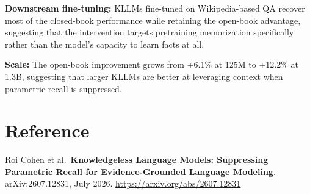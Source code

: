\documentclass[10pt,twocolumn]{article}
\begin{document}
\textbf{Downstream fine-tuning:} KLLMs fine-tuned on Wikipedia-based
QA recover most of the closed-book performance while retaining
the open-book advantage, suggesting that the intervention targets
pretraining memorization specifically rather than the model's capacity
to learn facts at all.

\textbf{Scale:} The open-book improvement grows from +6.1\% at 125M
to +12.2\% at 1.3B, suggesting that larger KLLMs are better at
leveraging context when parametric recall is suppressed.

\section*{Reference}

Roi Cohen et al.\
\textbf{Knowledgeless Language Models: Suppressing Parametric Recall
for Evidence-Grounded Language Modeling}.
arXiv:2607.12831, July 2026.
\url{https://arxiv.org/abs/2607.12831}
\end{document}
